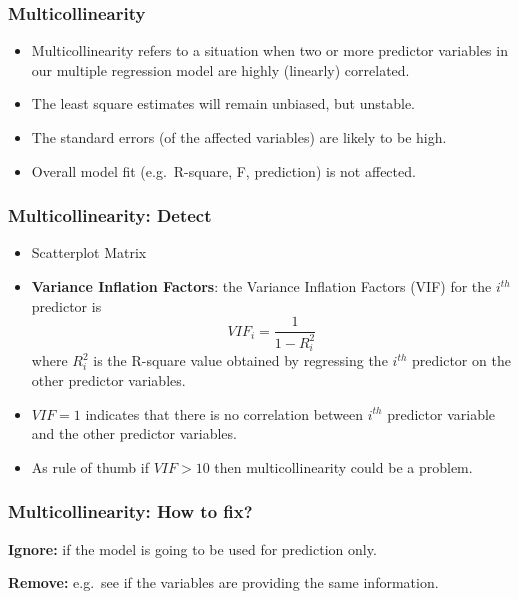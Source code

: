 \documentclass[
]{article}
\begin{document}
\hypertarget{multicollinearity}{%
\subsubsection{Multicollinearity}\label{multicollinearity}}

\begin{itemize}
\item
  Multicollinearity refers to a situation when two or more predictor
  variables in our multiple regression model are highly (linearly)
  correlated.
\item
  The least square estimates will remain unbiased, but unstable.
\item
  The standard errors (of the affected variables) are likely to be high.
\item
  Overall model fit (e.g.~R-square, F, prediction) is not affected.
\end{itemize}

\hypertarget{multicollinearity-detect}{%
\subsubsection{Multicollinearity:
Detect}\label{multicollinearity-detect}}

\begin{itemize}
\item
  Scatterplot Matrix
\item
  \textbf{Variance Inflation Factors}: the Variance Inflation Factors
  (VIF) for the \(i^{th}\) predictor is \[VIF_i=\frac{1}{1-R^2_i}\]
  where \(R^2_i\) is the R-square value obtained by regressing the
  \(i^{th}\) predictor on the other predictor variables.
\item
  \(VIF=1\) indicates that there is no correlation between \(i^{th}\)
  predictor variable and the other predictor variables.
\item
  As rule of thumb if \(VIF>10\) then multicollinearity could be a
  problem.
\end{itemize}

\hypertarget{multicollinearity-how-to-fix}{%
\subsubsection{Multicollinearity: How to
fix?}\label{multicollinearity-how-to-fix}}

\textbf{Ignore:} if the model is going to be used for prediction only.

\textbf{Remove:} e.g.~see if the variables are providing the same
information.
\end{document}
